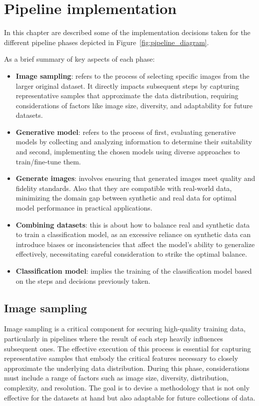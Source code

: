 \chapter{Pipeline implementation}

In this chapter are described some of the implementation decisions taken for the different pipeline phases depicted in Figure~\ref{fig:pipeline_diagram}.

As a brief summary of key aspects of each phase:
\begin{itemize}
    \item \textbf{Image sampling}: refers to the process of selecting specific images from the larger original dataset. It directly impacts subsequent steps by capturing representative samples that approximate the data distribution, requiring considerations of factors like image size, diversity, and adaptability for future datasets.
    \item \textbf{Generative model}: refers to the process of first, evaluating generative models by collecting and analyzing information to determine their suitability and second, implementing the chosen models using diverse approaches to train/fine-tune them.
    \item \textbf{Generate images}: involves ensuring that generated images meet quality and fidelity standards. Also that they are compatible with real-world data, minimizing the domain gap between synthetic and real data for optimal model performance in practical applications.
    \item \textbf{Combining datasets}: this is about how to balance real and synthetic data to train a classification model, as an excessive reliance on synthetic data can introduce biases or inconsistencies that affect the model's ability to generalize effectively, necessitating careful consideration to strike the optimal balance.
    \item \textbf{Classification model}: implies the training of the classification model based on the steps and decisions previously taken. 
\end{itemize}

\section{Image sampling}
\label{image_sampling}

Image sampling is a critical component for securing high-quality training data, particularly in pipelines where the result of each step heavily influences subsequent ones. The effective execution of this process is essential for capturing representative samples that embody the critical features necessary to closely approximate the underlying data distribution. During this phase, considerations must include a range of factors such as image size, diversity, distribution, complexity, and resolution. The goal is to devise a methodology that is not only effective for the datasets at hand but also adaptable for future collections of data.

